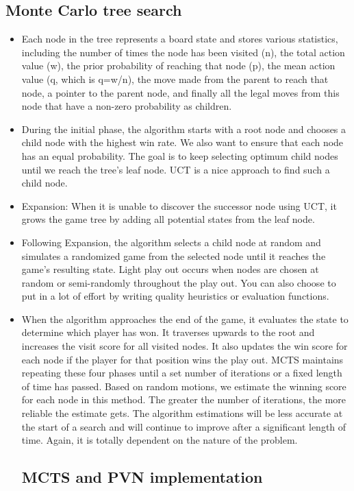 \documentclass[10pt,twocolumn]{article}
\begin{document}
\subsection{Monte Carlo tree search}
    \begin{itemize}
    \item Each node in the tree represents a board state and stores various statistics, including the number of times the node has been visited (n), the total action value (w), the prior probability of reaching that node (p), the mean action value (q, which is q=w/n), the move made from the parent to reach that node, a pointer to the parent node, and finally all the legal moves from this node that have a non-zero probability as children\cite{Java}.
    \item During the initial phase, the algorithm starts with a root node and chooses a child node with the highest win rate. We also want to ensure that each node has an equal probability. The goal is to keep selecting optimum child nodes until we reach the tree's leaf node. UCT is a nice approach to find such a child node\cite{Java}.
    \item Expansion: When it is unable to discover the successor node using UCT, it grows the game tree by adding all potential states from the leaf node.
    \item Following Expansion, the algorithm selects a child node at random and simulates a randomized game from the selected node until it reaches the game's resulting state. Light play out occurs when nodes are chosen at random or semi-randomly throughout the play out. You can also choose to put in a lot of effort by writing quality heuristics or evaluation functions\cite{Java}.
    \item When the algorithm approaches the end of the game, it evaluates the state to determine which player has won. It traverses upwards to the root and increases the visit score for all visited nodes. It also updates the win score for each node if the player for that position wins the play out. MCTS maintains repeating these four phases until a set number of iterations or a fixed length of time has passed. Based on random motions, we estimate the winning score for each node in this method. The greater the number of iterations, the more reliable the estimate gets. The algorithm estimations will be less accurate at the start of a search and will continue to improve after a significant length of time. Again, it is totally dependent on the nature of the problem.\cite{Dylan}
\subsection{MCTS and PVN implementation}


\end{itemize}
\end{document}
